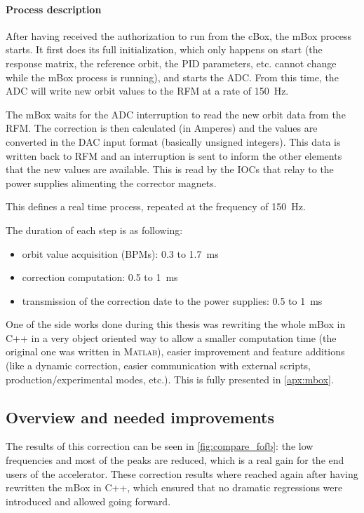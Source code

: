 \paragraph{Process description}
After having received the authorization to run from the cBox, the mBox process starts. It first does its full initialization, which only happens on start (the response matrix, the reference orbit, the PID parameters, etc. cannot change while the mBox process is running), and starts the ADC. From this time, the ADC will write new orbit values to the RFM at a rate of \SI{150}{\hertz}.

The mBox waits for the ADC interruption to read the new orbit data from the RFM. The correction is then calculated (in Amperes) and the values are converted in the DAC input format (basically unsigned integers). This data is written back to RFM and an interruption is sent to inform the other elements that the new values are available. This is read by the IOCs that relay to the power supplies alimenting the corrector magnets.

This defines a real time process, repeated at the frequency of \SI{150}{\hertz}.

The duration of each step is as following:
\begin{itemize}
\item orbit value acquisition (BPMs): 0.3 to \SI{1.7}{\milli\second}
\item correction computation: 0.5 to \SI{1}{\milli\second}
\item transmission of the correction date to the power supplies: 0.5 to \SI{1}{\milli\second}
\end{itemize}

\remark One of the side works done during this thesis was rewriting the whole mBox in C++ in a very object oriented way to allow a smaller computation time (the original one was written in \textsc{Matlab}), easier improvement and feature additions (like a dynamic correction, easier communication with external scripts, production/experimental modes, etc.). This is fully presented in \cref{apx:mbox}.

\subsection{Overview and needed improvements}
The results of this correction can be seen in \cref{fig:compare_fofb}: the low frequencies and most of the peaks are reduced, which is a real gain for the end users of the accelerator. These correction results where reached again after having rewritten the mBox in C++, which ensured that no dramatic regressions were introduced and allowed going forward.


